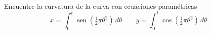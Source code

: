 \item Encuentre la curvatura de la curva con ecuaciones paramétricas
\[ x = \int_0^t \operatorname{sen} \left(\tfrac{1}{2}\pi \theta^2\right) \, d\theta \qquad y = \int_0^t \cos \left(\tfrac{1}{2}\pi \theta^2\right) \, d\theta \]
